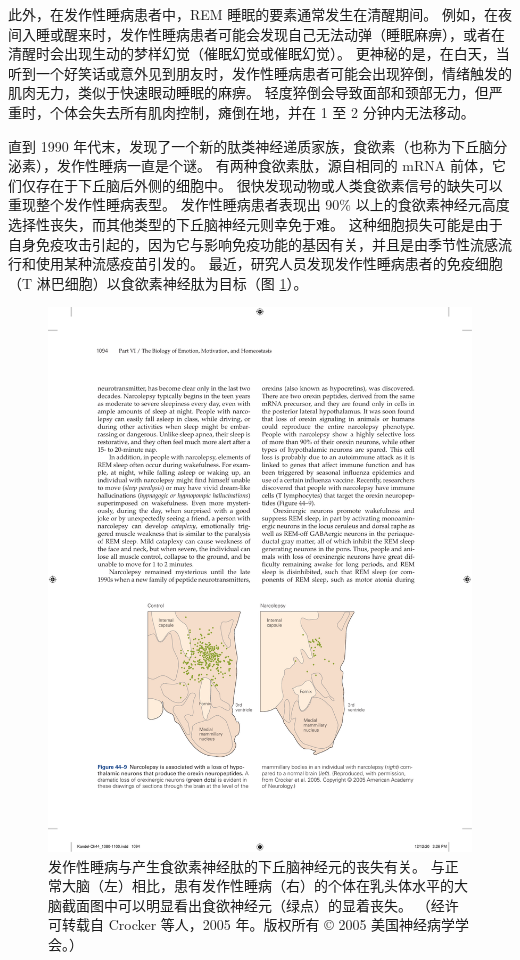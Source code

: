 此外，在发作性睡病患者中，REM 睡眠的要素通常发生在清醒期间。
例如，在夜间入睡或醒来时，发作性睡病患者可能会发现自己无法动弹（睡眠麻痹），或者在清醒时会出现生动的梦样幻觉（催眠幻觉或催眠幻觉）。
更神秘的是，在白天，当听到一个好笑话或意外见到朋友时，发作性睡病患者可能会出现猝倒，情绪触发的肌肉无力，类似于快速眼动睡眠的麻痹。
轻度猝倒会导致面部和颈部无力，但严重时，个体会失去所有肌肉控制，瘫倒在地，并在 1 至 2 分钟内无法移动。


直到 1990 年代末，发现了一个新的肽类神经递质家族，食欲素（也称为下丘脑分泌素），发作性睡病一直是个谜。
有两种食欲素肽，源自相同的 mRNA 前体，它们仅存在于下丘脑后外侧的细胞中。
很快发现动物或人类食欲素信号的缺失可以重现整个发作性睡病表型。
发作性睡病患者表现出 90\% 以上的食欲素神经元高度选择性丧失，而其他类型的下丘脑神经元则幸免于难。
这种细胞损失可能是由于自身免疫攻击引起的，因为它与影响免疫功能的基因有关，并且是由季节性流感流行和使用某种流感疫苗引发的。
最近，研究人员发现发作性睡病患者的免疫细胞（T 淋巴细胞）以食欲素神经肽为目标（图 \ref{fig:44_9}）。


\begin{figure}[htbp]
	\centering
	\includegraphics[width=0.7\linewidth]{chap44/fig_44_9}
	\caption{发作性睡病与产生食欲素神经肽的下丘脑神经元的丧失有关。 与正常大脑（左）相比，患有发作性睡病（右）的个体在乳头体水平的大脑截面图中可以明显看出食欲神经元（绿点）的显着丧失。 （经许可转载自 Crocker 等人，2005 年。版权所有 © 2005 美国神经病学学会。）}
	\label{fig:44_9}
\end{figure}


